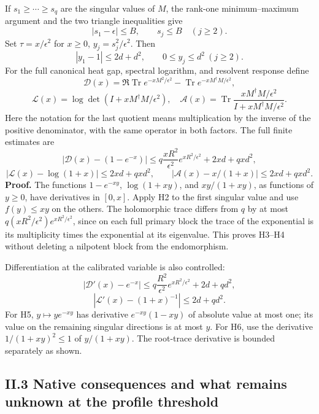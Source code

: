 If \(s_1\ge\cdots\ge s_q\) are the singular values of \(M\), the rank-one minimum--maximum argument and the two triangle inequalities give \[
 |s_1-\epsilon|\le B,\qquad s_j\le B\quad(j\ge2).
 \tag{H1}
\] Set \(\tau=x/\epsilon^2\) for \(x\ge0\), \(y_j=s_j^2/\epsilon^2\). Then \[
 |y_1-1|\le2d+d^2,\qquad 0\le y_j\le d^2\ (j\ge2).
 \tag{H2}
\] For the full canonical heat gap, spectral logarithm, and resolvent response define \[
 \mathcal D(x)=\Re\operatorname{Tr}e^{-xM^2/\epsilon^2}
                  -\operatorname{Tr}e^{-xM^\dagger M/\epsilon^2},
\] \[
 \mathcal L(x)=\log\det(I+xM^\dagger M/\epsilon^2),\quad
 \mathcal A(x)=\operatorname{Tr}\frac{xM^\dagger M/\epsilon^2}
                                      {I+xM^\dagger M/\epsilon^2}.
\] Here the notation for the last quotient means multiplication by the inverse of the positive denominator, with the same operator in both factors. The full finite estimates are \[
 \boxed{|\mathcal D(x)-(1-e^{-x})|
 \le q\frac{xR^2}{\epsilon^2}e^{xR^2/\epsilon^2}
             +2xd+qx d^2,}
 \tag{H3}
\] \[
 \boxed{|\mathcal L(x)-\log(1+x)|\le2xd+qx d^2,\qquad
 |\mathcal A(x)-x/(1+x)|\le2xd+qx d^2.}
 \tag{H4}
\] \textbf{Proof.} The functions \(1-e^{-xy}\), \(\log(1+xy)\), and \(xy/(1+xy)\), as functions of \(y\ge0\), have derivatives in \([0,x]\). Apply H2 to the first singular value and use \(f(y)\le xy\) on the others. The holomorphic trace differs from \(q\) by at most \(q(xR^2/\epsilon^2)e^{xR^2/\epsilon^2}\), since on each full primary block the trace of the exponential is its multiplicity times the exponential at its eigenvalue. This proves H3--H4 without deleting a nilpotent block from the endomorphism.

Differentiation at the calibrated variable is also controlled: \[
 \boxed{|\mathcal D'(x)-e^{-x}|
 \le q\frac{R^2}{\epsilon^2}e^{xR^2/\epsilon^2}+2d+qd^2,}
 \tag{H5}
\] \[
 \boxed{|\mathcal L'(x)-(1+x)^{-1}|\le2d+qd^2.}
 \tag{H6}
\] For H5, \(y\mapsto y e^{-xy}\) has derivative \(e^{-xy}(1-xy)\) of absolute value at most one; its value on the remaining singular directions is at most \(y\). For H6, use the derivative \(1/(1+xy)^2\le1\) of \(y/(1+xy)\). The root-trace derivative is bounded separately as shown.

\subsection{II.3 Native consequences and what remains unknown at the profile threshold}\label{ii.3-native-consequences-and-what-remains-unknown-at-the-profile-threshold}

